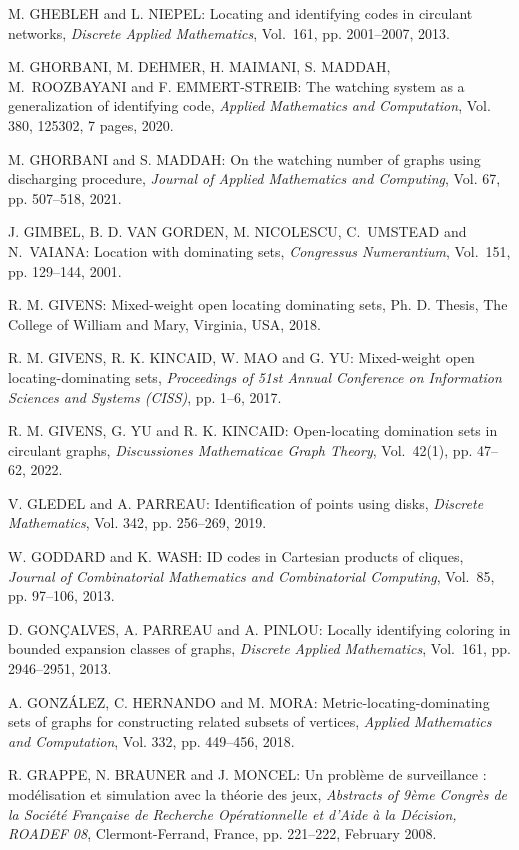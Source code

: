 \begin{thebibliography}{999}
M. GHEBLEH and L. NIEPEL: Locating and identifying codes in circulant networks, {\it Discrete Applied Mathematics}, Vol.~161, pp. 2001--2007, 2013.

M. GHORBANI, M. DEHMER, H. MAIMANI, S. MADDAH, M.~ROOZ\-BAYANI and F. EMMERT-STREIB: The watching system as a generalization of identifying code, {\it Applied Mathematics and Computation}, Vol. 380, 125302, 7 pages, 2020.

M. GHORBANI and S. MADDAH: On the watching number of graphs using discharging procedure, {\it Journal of Applied Mathematics and Computing}, Vol. 67, pp. 507--518, 2021.

J. GIMBEL, B. D. VAN GORDEN, M. NICOLESCU, C.~UMSTEAD and N.~VAIANA: Location with dominating sets, {\it Congressus Numerantium}, Vol.~151, pp. 129--144, 2001.

R. M. GIVENS: Mixed-weight open locating dominating sets, Ph. D. Thesis, The College of William and Mary, Virginia, USA, 2018.

R. M. GIVENS, R. K. KINCAID, W. MAO and G. YU: Mixed-weight open locating-dominating sets, {\it Proceedings of 51st Annual Conference on Information Sciences and Systems (CISS)}, pp. 1--6, 2017.

R. M. GIVENS, G. YU and R. K. KINCAID: Open-locating domination sets in
circulant graphs, {\it Discussiones Mathematicae Graph Theory}, Vol.~42(1), pp. 47--62, 2022.

V. GLEDEL and A. PARREAU: Identification of points using disks, {\it Discrete Mathematics}, Vol. 342, pp. 256--269, 2019.

W. GODDARD and K. WASH: ID codes in Cartesian products of cliques, {\it Journal of Combinatorial Mathematics and Combinatorial Computing}, Vol.~85, pp. 97--106, 2013.

D. GON\c CALVES, A. PARREAU and A. PINLOU: Locally identifying coloring in bounded expansion classes of graphs, {\it Discrete Applied Mathematics}, Vol.~161, pp. 2946--2951, 2013.

A. GONZ\'ALEZ, C. HERNANDO and  M. MORA: Metric-locating-dominating sets of graphs for constructing related subsets of vertices, {\it Applied Mathematics and Computation}, Vol. 332, pp. 449--456, 2018.

R. GRAPPE, N. BRAUNER and J. MONCEL: Un probl\`eme de surveillance : mod\'elisation et simulation avec la th\'eorie des jeux, {\it Abstracts of 9\`eme Congr\`es de la Soci\'et\'e Fran\c{c}aise de Recherche Op\'erationnelle et d'Aide \`a la D\'ecision, ROADEF 08}, Clermont-Ferrand, France, pp. 221--222, February 2008.


\end{thebibliography}
